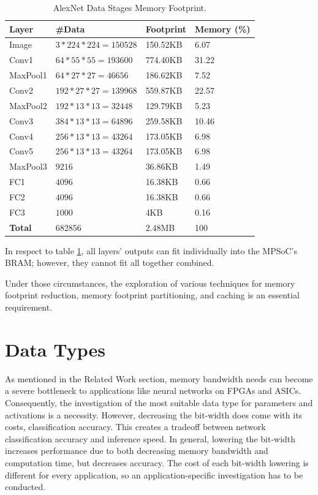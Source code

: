 \begin{table}[H]
	\caption{AlexNet Data Stages Memory Footprint.}
	\label{tab:AlexNet-Data-Stages-Memory-Footprint}
	\centering
	\begin{tabular}{llll}
		\toprule
		\textbf{Layer} & \textbf{\#Data} & \textbf{Footprint} & \textbf{Memory (\%)}  \\
		\midrule
			Image & $3 * 224 * 224 = 150528$ & 150.52KB & 6.07 \\
			Conv1 & $64 * 55 * 55 = 193600$ & 774.40KB & 31.22 \\
			MaxPool1 & $64 * 27 * 27 = 46656$ & 186.62KB & 7.52 \\
			Conv2 & $192 * 27 * 27 = 139968$ & 559.87KB & 22.57 \\
			MaxPool2 & $192 * 13 * 13 = 32448$ & 129.79KB & 5.23 \\
			Conv3 & $384 * 13 * 13 = 64896$ & 259.58KB & 10.46 \\
			Conv4 & $256 * 13 * 13 = 43264$ & 173.05KB & 6.98 \\
			Conv5 & $256 * 13 * 13 = 43264$ & 173.05KB & 6.98 \\
			MaxPool3 & $9216$ & 36.86KB & 1.49 \\
			FC1 & $4096$ & 16.38KB & 0.66 \\
			FC2 & $4096$ & 16.38KB & 0.66 \\
			FC3 & $1000$ & 4KB & 0.16 \\
		\midrule
			\textbf{Total} & 682856 & 2.48MB & 100 \\
		\bottomrule
	\end{tabular}
\end{table}

In respect to table \ref{tab:AlexNet-Data-Stages-Memory-Footprint}, all layers' outputs can fit individually into the MPSoC's BRAM; however, they cannot fit all together combined.

Under those circumstances, the exploration of various techniques for memory footprint reduction, memory footprint partitioning, and caching is an essential requirement.

\section{Data Types}
As mentioned in the Related Work section, memory bandwidth needs can become a severe bottleneck to applications like neural networks on FPGAs and ASICs. Consequently, the investigation of the most suitable data type for parameters and activations is a necessity. However, decreasing the bit-width does come with its costs, classification accuracy. This creates a tradeoff between network classification accuracy and inference speed. In general, lowering the bit-width increases performance due to both decreasing memory bandwidth and computation time, but decreases accuracy. The cost of each bit-width lowering is different for every application, so an application-specific investigation has to be conducted.

